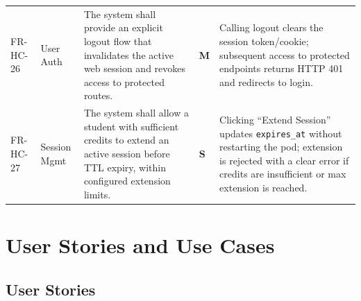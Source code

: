 \documentclass[12pt,a4paper]{article}
\newcommand{\Must}{\textcolor{dangered}{\textbf{M}}}
\newcommand{\Should}{\textcolor{warningyellow}{\textbf{S}}}
\begin{document}
\begin{longtable}{@{}L{2.1cm}L{1.8cm}L{5cm}C{1.4cm}L{5cm}@{}}
    FR-HC-26 & User Auth & The system shall provide an explicit logout flow that invalidates the active web session and revokes access to protected routes. & \Must & Calling logout clears the session token/cookie; subsequent access to protected endpoints returns HTTP 401 and redirects to login. \\
  FR-HC-27 & Session Mgmt & The system shall allow a student with sufficient credits to extend an active session before TTL expiry, within configured extension limits. & \Should & Clicking ``Extend Session'' updates \texttt{expires\_at} without restarting the pod; extension is rejected with a clear error if credits are insufficient or max extension is reached. \\
\end{longtable}

\newpage
\section{User Stories and Use Cases}

\subsection{User Stories}
\end{document}
